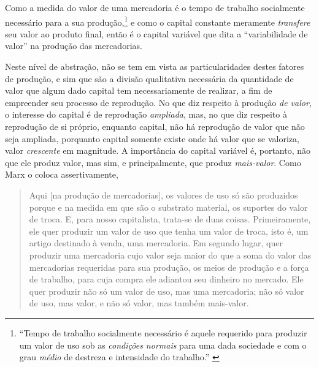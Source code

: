 Como a medida do valor de uma mercadoria é o tempo de trabalho socialmente necessário para a sua produção,\footnote{``Tempo de trabalho socialmente necessário é aquele requerido para produzir um valor de uso sob as \emph{condições normais} para uma dada sociedade e com o grau \emph{médio} de destreza e intensidade do trabalho.'' \parencite[p. 117, grifo meu]{Marx2017}} e como o capital constante meramente \emph{transfere} seu valor ao produto final, então é o capital variável que dita a ``variabilidade de valor'' na produção das mercadorias.



Neste nível de abstração, não se tem em vista as particularidades destes fatores de produção, e sim que são a divisão qualitativa necessária da quantidade de valor que algum dado capital tem necessariamente de realizar, a fim de empreender seu processo de reprodução. No que diz respeito à produção \textit{de valor}, o interesse do capital é de reprodução \textit{ampliada}, mas, no que diz respeito à reprodução de si próprio, enquanto capital, não há reprodução de valor que não seja ampliada, porquanto capital somente existe onde há valor que se valoriza, valor \textit{crescente} em magnitude. A importância do capital variável é, portanto, não que ele produz valor, mas sim, e principalmente, que produz \textit{mais-valor}. Como Marx o coloca assertivamente,
\begin{quote}
    Aqui [na produção de mercadorias], os valores de uso só são produzidos porque e na medida em que são o substrato material, os suportes do valor de troca. E, para nosso capitalista, trata-se de duas coisas. Primeiramente, ele quer produzir um valor de uso que tenha um valor de troca, isto é, um artigo destinado à venda, uma mercadoria. Em segundo lugar, quer produzir uma mercadoria cujo valor seja maior do que a soma do valor das mercadorias requeridas para sua produção, os meios de produção e a força de trabalho, para cuja compra ele adiantou seu dinheiro no mercado. Ele quer produzir não só um valor de uso, mas uma mercadoria; não só valor de uso, mas valor, e não só valor, mas também mais-valor. \parencite[p. 263]{Marx2017} 
\end{quote}

